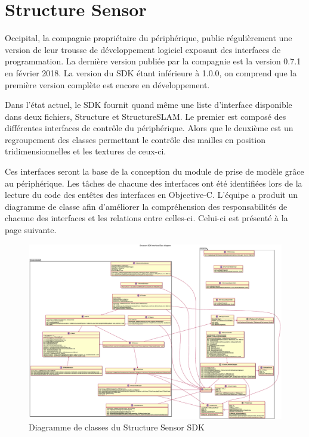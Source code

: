 \documentclass[letterpaper,twoside,12pt,french]{report}
\begin{document}
\section*{Structure Sensor}
Occipital, la compagnie propriétaire du périphérique, publie régulièrement une version de leur
trousse de développement logiciel exposant des interfaces de programmation. La dernière version
publiée par la compagnie est la version 0.7.1 en février 2018. \citep*{occipitalsdk} La version du
SDK étant inférieure à 1.0.0, on comprend que la première version complète est encore en
développement.
\par
Dans l'état actuel, le SDK fournit quand même une liste d'interface disponible dans deux fichiers,
Structure et StructureSLAM. Le premier est composé des différentes interfaces de contrôle du
périphérique. Alors que le deuxième est un regroupement des classes permettant le contrôle des
mailles en position tridimensionnelles et les textures de ceux-ci.
\par
Ces interfaces seront la base de la conception du module de prise de modèle grâce au périphérique.
Les tâches de chacune des interfaces ont été identifiées lors de la lecture du code des entêtes
des interfaces en Objective-C. L'équipe a produit un diagramme de classe afin d'améliorer la
compréhension des responsabilités de chacune des interfaces et les relations entre celles-ci.
Celui-ci est présenté à la page suivante.

\begin{figure}[H]
    \includegraphics[width=\textwidth]{StructureClassDiagram.eps}
\centering
    \caption{Diagramme de classes du Structure Sensor SDK}
\end{figure}
\end{document}
